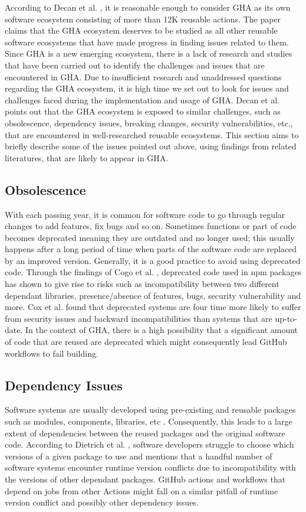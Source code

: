 \documentclass[conference]{IEEEtran}
\begin{document}
According to Decan et al. \cite{b4}, it is reasonable enough to consider GHA as its own software ecosystem consisting of more than 12K reusable actions. The paper claims that the GHA ecosystem deserves to be studied as all other reusable software ecosystems that have made progress in finding issues related to them. Since GHA is a new emerging ecosystem, there is a lack of research and studies that have been carried out to identify the challenges and issues that are encountered in GHA. Due to insufficient research and unaddressed questions regarding the GHA ecosystem, it is high time we set out to look for issues and challenges faced during the implementation and usage of GHA. Decan et al. \cite{b4} points out that the GHA ecosystem is exposed to similar challenges, such as obsolescence, dependency issues, breaking changes, security vulnerabilities, etc., that are encountered in well-researched reusable ecosystems. This section aims to briefly describe some of the issues pointed out above, using findings from related literatures, that are likely to appear in GHA.
\subsection{Obsolescence}

With each passing year, it is common for software code to go through regular changes to add features, fix bugs and so on. Sometimes functions or part of code becomes deprecated meaning they are outdated and no longer used; this usually happens after a long period of time when parts of the software code are replaced by an improved version. Generally, it is a good practice to avoid using deprecated code. Through the findings of Cogo et al. \cite{b6}, deprecated code used in npm packages has shown to give rise to risks such as incompatibility between two different dependant libraries, presence/absence of features, bugs, security vulnerability and more. Cox et al. \cite{b17} found that deprecated systems are four time more likely to suffer from security issues and backward incompatibilities than systems that are up-to-date. In the context of GHA, there is a high possibility that a significant amount of code that are reused are deprecated which might consequently lead GitHub workflows to fail building.
\subsection{Dependency Issues}
Software systems are usually developed using pre-existing and reusable packages such as modules, components, libraries, etc \cite{b7}\cite{b8}. Consequently, this leads to a large extent of dependencies between the reused packages and the original software code. According to Dietrich et al. \cite{b10}, software developers struggle to choose which versions of a given package to use and mentions that a handful number of software systems encounter runtime version conflicts due to incompatibility with the versions of other dependant packages. GitHub actions and workflows that depend on jobs from other Actions might fall on a similar pitfall of runtime version conflict and possibly other dependency issues.
\end{document}
